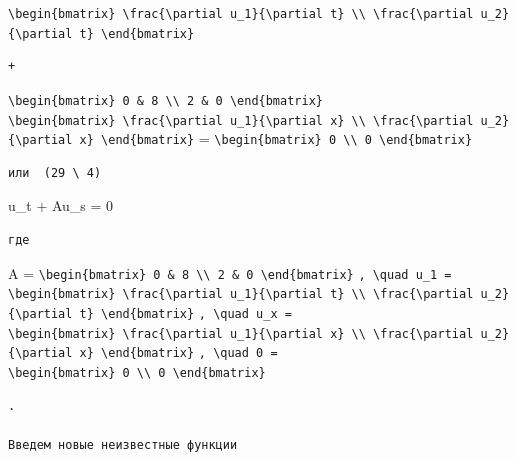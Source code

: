 \documentclass[
  ukrainian,
]{article}
\begin{document}
\texttt{\textbackslash{}begin\{bmatrix\}\ \textbackslash{}frac\{\textbackslash{}partial\ u\_1\}\{\textbackslash{}partial\ t\}\ \textbackslash{}\textbackslash{}\ \textbackslash{}frac\{\textbackslash{}partial\ u\_2\}\{\textbackslash{}partial\ t\}\ \textbackslash{}end\{bmatrix\}}

\begin{verbatim}
+
\end{verbatim}

\texttt{\textbackslash{}begin\{bmatrix\}\ 0\ \&\ 8\ \textbackslash{}\textbackslash{}\ 2\ \&\ 0\ \textbackslash{}end\{bmatrix\}}
\texttt{\textbackslash{}begin\{bmatrix\}\ \textbackslash{}frac\{\textbackslash{}partial\ u\_1\}\{\textbackslash{}partial\ x\}\ \textbackslash{}\textbackslash{}\ \textbackslash{}frac\{\textbackslash{}partial\ u\_2\}\{\textbackslash{}partial\ x\}\ \textbackslash{}end\{bmatrix\}}
=
\texttt{\textbackslash{}begin\{bmatrix\}\ 0\ \textbackslash{}\textbackslash{}\ 0\ \textbackslash{}end\{bmatrix\}}

\begin{verbatim}
или  (29 \ 4)
\end{verbatim}

u\_t + Au\_s = 0

\begin{verbatim}
где
\end{verbatim}

A =
\texttt{\textbackslash{}begin\{bmatrix\}\ 0\ \&\ 8\ \textbackslash{}\textbackslash{}\ 2\ \&\ 0\ \textbackslash{}end\{bmatrix\}}
\texttt{,\ \textbackslash{}quad\ u\_1\ =}
\texttt{\textbackslash{}begin\{bmatrix\}\ \textbackslash{}frac\{\textbackslash{}partial\ u\_1\}\{\textbackslash{}partial\ t\}\ \textbackslash{}\textbackslash{}\ \textbackslash{}frac\{\textbackslash{}partial\ u\_2\}\{\textbackslash{}partial\ t\}\ \textbackslash{}end\{bmatrix\}}
\texttt{,\ \textbackslash{}quad\ u\_x\ =}
\texttt{\textbackslash{}begin\{bmatrix\}\ \textbackslash{}frac\{\textbackslash{}partial\ u\_1\}\{\textbackslash{}partial\ x\}\ \textbackslash{}\textbackslash{}\ \textbackslash{}frac\{\textbackslash{}partial\ u\_2\}\{\textbackslash{}partial\ x\}\ \textbackslash{}end\{bmatrix\}}
\texttt{,\ \textbackslash{}quad\ 0\ =}
\texttt{\textbackslash{}begin\{bmatrix\}\ 0\ \textbackslash{}\textbackslash{}\ 0\ \textbackslash{}end\{bmatrix\}}

\begin{verbatim}
.

Введем новые неизвестные функции
\end{verbatim}
\end{document}
